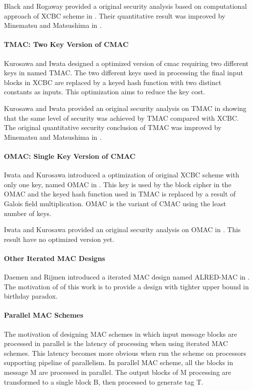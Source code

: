 \documentclass{article}
\begin{document}
Black and Rogaway provided a original security analysis based on computational approach of XCBC scheme in \cite{xcbc}. Their quantitative result was improved by Minematsu and Matsushima in \cite{new}. 
\paragraph{TMAC: Two Key Version of CMAC}
Kurosawa and Iwata designed a optimized version of cmac requiring two different keys in \cite{tmac} named TMAC.  
The two different keys used in processing the final input blocks in XCBC are replaced by a keyed hash function with two distinct constants as inputs. This optimization aims to reduce the key cost. 

Kurosawa and Iwata provided an original security analysis on TMAC in \cite{tmac} showing that the same level of security was achieved by TMAC compared with XCBC. The original quantitative security conclusion of TMAC was improved by Minematsu and Matsushima in \cite{new}. 
\paragraph{OMAC: Single Key Version of CMAC}
Iwata and Kurosawa introduced a optimization of original XCBC scheme with only one key, named OMAC in \cite{omac}. This key is used by the block cipher in the OMAC and the keyed hash function used in TMAC is replaced by a result of Galois field multiplication. OMAC is the variant of CMAC using the least number of keys. 

Iwata and Kurosawa provided an original security analysis on OMAC in \cite{omac}. This result have no optimized version yet.
\paragraph{Other Iterated MAC Designs}
Daemen and Rijmen introduced a iterated MAC design named ALRED-MAC in \cite{alred}. The motivation of of this work is to provide a design with tighter upper bound in birthday paradox. 
\paragraph{Parallel MAC Schemes}
The motivation of designing MAC schemes in which input message blocks are processed in parallel is the latency of processing when using iterated MAC schemes. This latency becomes more obvious when run the scheme on processors supporting pipeline of parallelism. 
In parallel MAC scheme, all the blocks in message M are processed in parallel. The output blocks of M processing are transformed to a single block B, then processed to generate tag T. 
\end{document}

